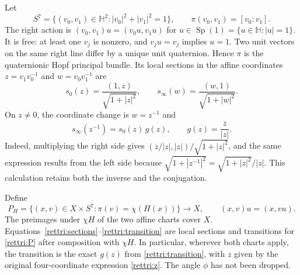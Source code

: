\documentclass[11pt]{article}
\theoremstyle{definition}
\begin{document}
Let
\[
 S^7=\{(v_0,v_1)\in\mathbb H^2:|v_0|^2+|v_1|^2=1\},\qquad
 \pi(v_0,v_1)=[v_0:v_1].
\]
The right action is $(v_0,v_1)u=(v_0u,v_1u)$ for
$u\in\operatorname{Sp}(1)=\{u\in\mathbb H:|u|=1\}$. It is free:
at least one $v_j$ is nonzero, and $v_ju=v_j$ implies $u=1$.
Two unit vectors on the same right line differ by a unique unit
quaternion. Hence $\pi$ is the quaternionic Hopf principal bundle.
Its local sections in the affine coordinates $z=v_1v_0^{-1}$ and
$w=v_0v_1^{-1}$ are
\begin{equation}
 s_0(z)=\frac{(1,z)}{\sqrt{1+|z|^2}},\qquad
 s_\infty(w)=\frac{(w,1)}{\sqrt{1+|w|^2}}.
 \label{rettri:sections}
\end{equation}
On $z\ne0$, the coordinate change is $w=z^{-1}$ and
\begin{equation}
 s_\infty(z^{-1})=s_0(z)\,g(z),\qquad
 g(z)=\frac{\overline z}{|z|}.
 \label{rettri:transition}
\end{equation}
Indeed, multiplying the right side gives
$(\overline z/|z|,|z|)/\sqrt{1+|z|^2}$, and the same expression
results from the left side because
$\sqrt{1+|z^{-1}|^2}=\sqrt{1+|z|^2}/|z|$.
This calculation retains both the inverse and the conjugation.

Define
\begin{equation}
 P_H=\{(x,v)\in X\times S^7:\pi(v)=\chi(H(x))\}
       \longrightarrow X,
 \qquad (x,v)u=(x,vu).
 \label{rettri:P}
\end{equation}
The preimages under $\chi H$ of the two affine charts cover $X$.
Equations~\eqref{rettri:sections}--\eqref{rettri:transition}
are local sections and transitions for \eqref{rettri:P} after
composition with $\chi H$. In particular, wherever both charts apply,
the transition is the exact $g(z)$ from \eqref{rettri:transition},
with $z$ given by the original four-coordinate expression
\eqref{rettri:z}. The angle $\phi$ has not been dropped.
\end{document}
